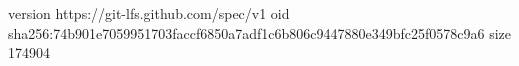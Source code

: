 version https://git-lfs.github.com/spec/v1
oid sha256:74b901e7059951703faccf6850a7adf1c6b806c9447880e349bfc25f0578c9a6
size 174904
